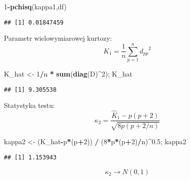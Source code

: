 \documentclass[polish,]{book}
\newenvironment{Shaded}{\begin{snugshade}}{\end{snugshade}}
\newcommand{\DecValTok}[1]{\textcolor[rgb]{0.00,0.00,0.81}{#1}}
\newcommand{\FloatTok}[1]{\textcolor[rgb]{0.00,0.00,0.81}{#1}}
\newcommand{\KeywordTok}[1]{\textcolor[rgb]{0.13,0.29,0.53}{\textbf{#1}}}
\newcommand{\NormalTok}[1]{#1}
\newcommand{\OperatorTok}[1]{\textcolor[rgb]{0.81,0.36,0.00}{\textbf{#1}}}
\newcommand{\StringTok}[1]{\textcolor[rgb]{0.31,0.60,0.02}{#1}}
\begin{document}
\begin{Shaded}
\begin{Highlighting}[]
\DecValTok{1}\OperatorTok{-}\KeywordTok{pchisq}\NormalTok{(kappa1,df)}
\end{Highlighting}
\end{Shaded}

\begin{verbatim}
## [1] 0.01847459
\end{verbatim}

Parametr wielowymiarowej kurtozy:
\begin{equation}
K_1=\frac{1}{n}\sum_{p=1}^{n}{d_{pp}}^2
\label{eq:wz1136}
\end{equation}

\begin{Shaded}
\begin{Highlighting}[]
\NormalTok{K_hat <-}\StringTok{ }\DecValTok{1}\OperatorTok{/}\NormalTok{n }\OperatorTok{*}\StringTok{ }\KeywordTok{sum}\NormalTok{(}\KeywordTok{diag}\NormalTok{(D)}\OperatorTok{^}\DecValTok{2}\NormalTok{); K_hat}
\end{Highlighting}
\end{Shaded}

\begin{verbatim}
## [1] 9.305538
\end{verbatim}

Statystyka testu:
\begin{equation}
\kappa_2=\frac{\hat{K}_1-p(p+2)}{\sqrt{8p(p+2/n)}}
\label{eq:wz1137}
\end{equation}

\begin{Shaded}
\begin{Highlighting}[]
\NormalTok{kappa2 <-}\StringTok{ }\NormalTok{(K_hat}\OperatorTok{-}\NormalTok{p}\OperatorTok{*}\NormalTok{(p}\OperatorTok{+}\DecValTok{2}\NormalTok{)) }\OperatorTok{/}\StringTok{ }\NormalTok{(}\DecValTok{8}\OperatorTok{*}\NormalTok{p}\OperatorTok{*}\NormalTok{(p}\OperatorTok{+}\DecValTok{2}\NormalTok{)}\OperatorTok{/}\NormalTok{n)}\OperatorTok{^}\FloatTok{0.5}\NormalTok{; kappa2}
\end{Highlighting}
\end{Shaded}

\begin{verbatim}
## [1] 1.153943
\end{verbatim}

\begin{equation}
\kappa_2\longrightarrow N(0,1)
\label{eq:wz1138}
\end{equation}
\end{document}
